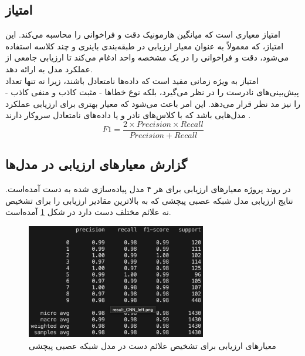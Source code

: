 \subsection{امتیاز }
امتیاز  معیاری است که میانگین هارمونیک دقت و فراخوانی را محاسبه می‌کند. این امتیاز، که معمولاً به عنوان معیار ارزیابی در طبقه‌بندی باینری و چند کلاسه استفاده می‌شود، دقت و فراخوانی را در یک مشخصه
واحد ادغام می‌کند تا ارزیابی جامعی از عملکرد مدل به ارائه دهد.
\\
امتیاز  به ویژه زمانی مفید است که داده‌ها نامتعادل باشند، زیرا نه تنها تعداد پیش‌بینی‌های نادرست را در نظر می‌گیرد، بلکه نوع خطاها - مثبت کاذب و منفی کاذب - را نیز مد نظر قرار می‌دهد. این امر باعث می‌شود که  معیار بهتری برای ارزیابی عملکرد مدل‌هایی باشد که با کلاس‌های نادر و یا داده‌های نامتعادل سروکار دارند \cite{F1scorei14:online}.
\begin{equation}
    F1  = \frac{2 \times Precision \times Recall}{Precision + Recall} 
\end{equation}




\subsection{گزارش معیارهای ارزیابی در مدل‌ها}
در روند پروژه معیار‌های ارزیابی برای هر ۴ مدل پیاده‌سازی شده به دست آمده‌است. نتایج ارزیابی مدل‌ شبکه عصبی پیچشی که به بالاترین مقادیر ارزیابی را برای تشخیص نه علائم مختلف دست دارد در شکل \ref{report} آمده‌است.


\begin{figure}[h]
    \centering
    \includegraphics[width=0.7\textwidth]{Report_CNN.png}
    \caption{ معیارهای ارزیابی برای تشخیص علائم دست در مدل شبکه عصبی پیچشی}
    \label{report}
\end{figure}

